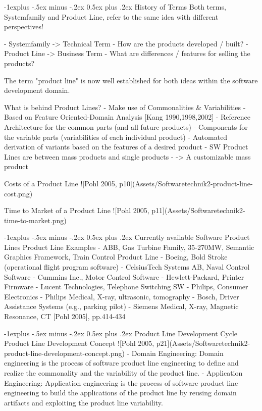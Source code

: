 \documentclass[a4paper]{article}
\makeatletter
\renewcommand{\subsection}{\@startsection{subsection}{2}{0mm}%
                                {-1explus -.5ex minus -.2ex}%
                                {0.5ex plus .2ex}%
                                {\normalfont\normalsize\bfseries}}
\makeatother
\begin{document}
\begin{multicols}{3}
  \subsection{History of Terms}
  Both terms, Systemfamily and Product Line, refer to the same idea with different perspectives!
  
  - Systemfamily -> Technical Term
      - How are the products developed / built?
  - Product Line -> Business Term
      - What are differences / features for selling the products?
  
  The term "product line" is now well established for both ideas within the software development domain.
  
  What is behind Product Lines?
  - Make use of Commonalities \& Variabilities
  - Based on Feature Oriented-Domain Analysis [Kang 1990,1998,2002]
  - Reference Architecture for the common parts (and all future products)
  - Components for the variable parts (variabilities of each individual product)
  - Automated derivation of variants based on the features of a desired product
  - SW Product Lines are between mass products and single products
  - -> A customizable mass product
  
  Costs of a Product Line
  ![Pohl 2005, p10](Assets/Softwaretechnik2-product-line-cost.png)
  
  Time to Market of a Product Line
  ![Pohl 2005, p11](Assets/Softwaretechnik2-time-to-market.png)
  
  \subsection{Currently available Software Product Lines}
  Product Line Examples
  - ABB, Gas Turbine Family, 35-270MW, Semantic Graphics Framework, Train Control Product Line
  - Boeing, Bold Stroke (operational flight program software)
  - CelsiusTech Systems AB, Naval Control Software
  - Cummins Inc., Motor Control Software
  - Hewlett-Packard, Printer Firmware
  - Lucent Technologies, Telephone Switching SW
  - Philips, Consumer Electronics
  - Philips Medical, X-ray, ultrasonic, tomography
  - Bosch, Driver Assistance Systems (e.g., parking pilot)
  - Siemens Medical, X-ray, Magnetic Resonance, CT [Pohl 2005], pp.414-434
  
  
  \subsection{Product Line Development Cycle}
  Product Line Development Concept
  ![Pohl 2005, p21](Assets/Softwaretechnik2-product-line-development-concept.png)
  - Domain Engineering: Domain engineering is the process of software product line engineering to define and realize the commonality and the variability of the product line.
  - Application Engineering: Application engineering is the process of software product line engineering to build the applications of the product line by reusing domain artifacts and exploiting the product line variability.
  

\end{multicols}
\end{document}
